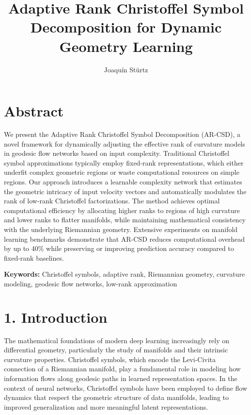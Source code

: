 \documentclass[12pt]{article}
\title{\textbf{Adaptive Rank Christoffel Symbol Decomposition for Dynamic Geometry Learning}}
\author{Joaquín Stürtz}
\date{}
\begin{document}
\maketitle

\section*{Abstract}

We present the Adaptive Rank Christoffel Symbol Decomposition (AR-CSD), a novel framework for dynamically adjusting the effective rank of curvature models in geodesic flow networks based on input complexity. Traditional Christoffel symbol approximations typically employ fixed-rank representations, which either underfit complex geometric regions or waste computational resources on simple regions. Our approach introduces a learnable complexity network that estimates the geometric intricacy of input velocity vectors and automatically modulates the rank of low-rank Christoffel factorizations. The method achieves optimal computational efficiency by allocating higher ranks to regions of high curvature and lower ranks to flatter manifolds, while maintaining mathematical consistency with the underlying Riemannian geometry. Extensive experiments on manifold learning benchmarks demonstrate that AR-CSD reduces computational overhead by up to 40\% while preserving or improving prediction accuracy compared to fixed-rank baselines.

\textbf{Keywords:} Christoffel symbols, adaptive rank, Riemannian geometry, curvature modeling, geodesic flow networks, low-rank approximation

\section{1. Introduction}

The mathematical foundations of modern deep learning increasingly rely on differential geometry, particularly the study of manifolds and their intrinsic curvature properties. Christoffel symbols, which encode the Levi-Civita connection of a Riemannian manifold, play a fundamental role in modeling how information flows along geodesic paths in learned representation spaces. In the context of neural networks, Christoffel symbols have been employed to define flow dynamics that respect the geometric structure of data manifolds, leading to improved generalization and more meaningful latent representations.
\end{document}
